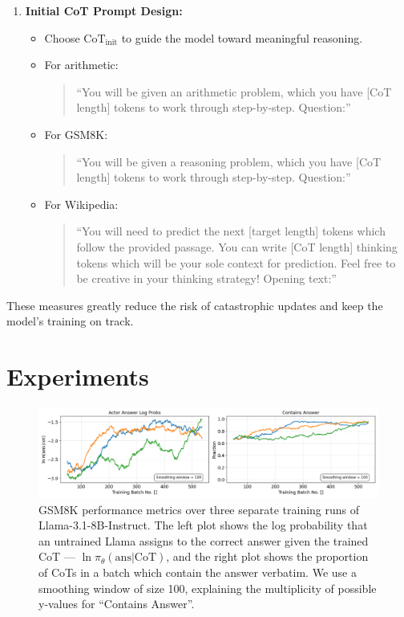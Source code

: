 \documentclass[letterpaper]{article} %
\begin{document}
\begin{enumerate}
    \item \textbf{Initial CoT Prompt Design:} 
    \begin{itemize}
        \item Choose $\text{CoT}_{\text{init}}$ to guide the model toward meaningful reasoning. 
        \item For arithmetic: 
        \begin{quote}
            \small
            ``You will be given an arithmetic problem, which you have [CoT length] tokens to work through step-by-step. Question:''
        \end{quote}
        \item For GSM8K:
        \begin{quote}
            \small
            ``You will be given a reasoning problem, which you have [CoT length] tokens to work through step-by-step. Question:''
        \end{quote}
        \item For Wikipedia:
        \begin{quote}
            \small
            ``You will need to predict the next [target length] tokens which follow the provided passage. You can write [CoT length] thinking tokens which will be your sole context for prediction. Feel free to be creative in your thinking strategy! Opening text:''
        \end{quote}
    \end{itemize}
\end{enumerate}

These measures greatly reduce the risk of catastrophic updates and keep the model's training on track.



\section{Experiments}
\label{sec:experiments}
\begin{figure}
    \centering
    \includegraphics[width=\textwidth]{Figures/llama_combined_metrics_gsm8k.png}
    \caption{GSM8K performance metrics over three separate training runs of Llama-3.1-8B-Instruct. The left plot shows the log probability that an untrained Llama assigns to the correct answer given the trained CoT --- $\ln \pi_\theta(\text{ans}|\text{CoT})$, and the right plot shows the proportion of CoTs in a batch which contain the answer verbatim. We use a smoothing window of size 100, explaining the multiplicity of possible y-values for ``Contains Answer''.}
    \label{fig:gsm8k_performance}
\end{figure}
\end{document}

